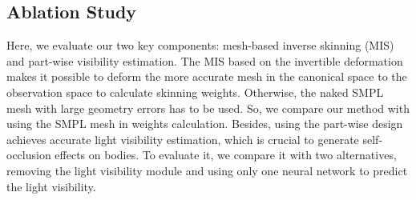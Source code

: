 \begin{table}[]
\begin{center}
\caption{Quantitative comparison of the reconstructed geometry on synthetic data.}
\label{tab:geo}
\end{center}
\end{table}


\subsection{Ablation Study}
\label{sec:ablation}
Here, we evaluate our two key components: mesh-based inverse skinning (MIS) and part-wise visibility estimation. 
The MIS based on the invertible deformation makes it possible to deform the more accurate mesh in the canonical space to the observation space to calculate skinning weights. 
Otherwise, the naked SMPL mesh with large geometry errors has to be used. 
So, we compare our method with using the SMPL mesh in weights calculation. 
Besides, using the part-wise design achieves accurate light visibility estimation, which is crucial to generate self-occlusion effects on bodies.
To evaluate it, we compare it with two alternatives, removing the light visibility module and using only one neural network to predict the light visibility.

